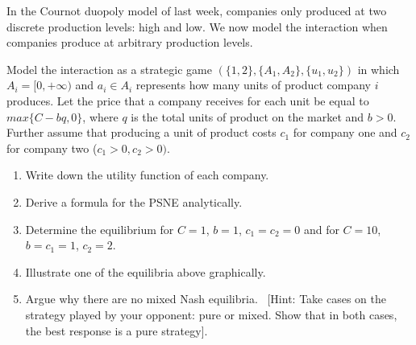 \documentclass[../main.tex]{subfiles}
\begin{document}
\begin{question}
	In the Cournot duopoly model of last week, companies only produced at two discrete production levels: high and low. We now model the interaction when companies produce at arbitrary production levels.
	
	Model the interaction as a strategic game $(\{1,2\},\{A_1,A_2\},\{u_1,u_2\})$ in which $A_i = [0, +\infty)$ and $a_i \in A_i$ represents how many units of product company $i$ produces. Let the price that a company receives for each unit be equal to $max\{C - bq, 0\}$, where $q$ is the total units of product on the market and $b > 0$. Further assume that producing a unit of product costs $c_1$ for company one and $c_2$ for company two ($c_1 > 0, c_2 > 0)$.
	
	\begin{enumerate}
	\item Write down the utility function of each company.
	\item Derive a formula for the PSNE analytically.
	\item Determine the equilibrium for $C = 1$, $b = 1$, $c_1 = c_2 = 0$ and for $C = 10$, $b = c_1 = 1$, $c_2 = 2$.
	\item Illustrate one of the equilibria above graphically.
	\item Argue why there are no mixed Nash equilibria. \
	[Hint: Take cases on the strategy played by your opponent: pure or mixed. Show that in both cases, the best response is a pure strategy].
	\end{enumerate}
\end{question}
\end{document}
